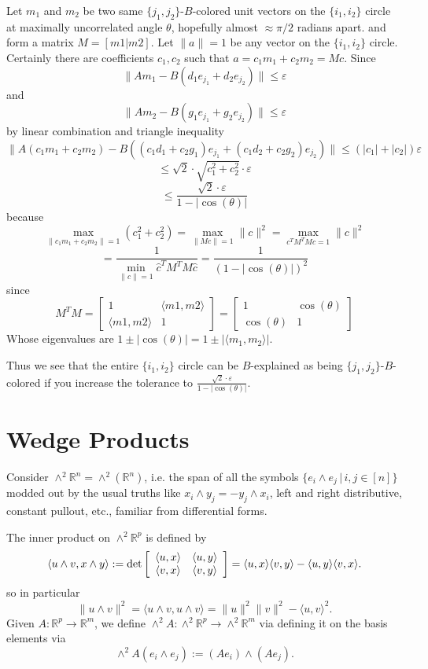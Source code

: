 \documentclass[11pt]{amsart}
\newcommand{\R}{\mathbb{R}}
\begin{document}
Let $m_1$ and $m_2$ be two same $\{j_1,j_2\}$-$B$-colored unit vectors on the $\{i_1,i_2\}$ circle at maximally uncorrelated 
angle $\theta$, 
hopefully almost $\approx \pi/2$  radians apart. 
and form a matrix $M=[m1|m2]$.  Let $\|a\|=1$ be any vector on the $\{i_1,i_2\}$ circle.  Certainly there are coefficients $c_1, c_2$
such that $a=c_1 m_1 +c_2 m_2 =Mc$.  Since 
\[\|Am_1-B(d_1 e_{j_1}+d_2e_{j_2})\|\leq \varepsilon \] and 
\[\|Am_2-B(g_1 e_{j_1}+g_2e_{j_2})\|\leq \varepsilon \]
by linear combination and triangle inequality
\[\|A(c_1m_1+c_2m_2)-B((c_1d_1+c_2g_1 )e_{j_1}+(c_1d_2+c_2g_2)e_{j_2})\|\leq (|c_1|+|c_2|)\varepsilon \]
\[\leq \sqrt{2}\cdot \sqrt{c_1^2+c_2^2} \cdot \varepsilon \]
\[\leq \frac{\sqrt{2} \cdot \varepsilon}{1-|\cos(\theta)|} \]
because 
\[\underset{\|c_1 m_1 +c_2 m_2\|=1}{\max} \left(c_1^2+c_2^2\right)=\underset{\|Mc\|=1}{\max} \|c\|^2=\underset{c^TM^TMc=1}{\max} \|c\|^2\]
\[=\frac{1}{\underset{ \|\hat{c}\|=1}{\min} \hat{c}^TM^TM\hat{c}}=\frac{1}{(1-|\cos(\theta)|)^2}\]
since \[M^TM=\left[\begin{array}{cc}1 & \langle m1, m2 \rangle \\ \langle m1 , m2 \rangle & 1 \end{array}\right]
=\left[\begin{array}{cc}1 & \cos(\theta) \\ \cos(\theta) & 1 \end{array}\right]\]
Whose eigenvalues are $1\pm |\cos(\theta)|=1\pm |\langle m_1, m_2 \rangle|$.

Thus we see that the entire $\{i_1,i_2\}$ circle can be $B$-explained as being  $\{j_1,j_2\}$-$B$-colored if you increase the 
tolerance to $\frac{\sqrt{2} \cdot \varepsilon}{1-|\cos(\theta)|}$.
\section{Wedge Products}
Consider $\wedge^2 \R^n=\wedge^2 (\R^n)$, i.e. the span of all the symbols $\{e_i\wedge e_j\,|\, i,j\in [n]\}$ modded out by the 
usual truths like $x_i\wedge y_j=-y_j\wedge x_i$, left and right distributive, constant pullout, etc., familiar from differential forms.

The inner product on $\wedge^2 \R^p$ is defined by 
\begin{equation}
\langle u\wedge v, x \wedge y \rangle:=\det \left[ \begin{array}{c c} 
 \langle u,x \rangle &  \langle u,y \rangle \\ 
 \langle v,x \rangle & \langle v,y \rangle \\ 
 \end{array} \right]
 = \langle u,x \rangle  \langle v,y \rangle -   \langle u,y \rangle  \langle v,x \rangle.
\end{equation}
so in particular
\begin{equation}
\|u\wedge v\|^2=
\langle u\wedge v, u \wedge v \rangle 
= \|u\|^2  \|v\|^2 -   \langle u,v \rangle^2.
\end{equation}
Given $A:\R^p\rightarrow \R^m$, we define $\wedge^2 A: \wedge^2 \R^p \rightarrow \wedge^2 \R^m$ via defining it on the basis 
elements via
\[\wedge^2 A(e_i\wedge e_j) :=(Ae_i) \wedge (Ae_j). \]
\end{document}
